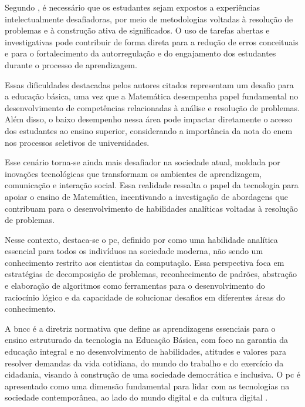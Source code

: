 Segundo , é necessário que os estudantes
sejam expostos a experiências intelectualmente desafiadoras, por meio
de metodologias voltadas à resolução de problemas e à construção ativa 
de significados. O uso de tarefas abertas e
investigativas pode contribuir de forma direta para a redução de erros
conceituais e para o fortalecimento da autorregulação e do engajamento dos
estudantes durante o processo de aprendizagem.

Essas dificuldades destacadas pelos autores citados representam um desafio para a
educação básica, uma vez que a Matemática desempenha papel fundamental no
desenvolvimento de competências relacionadas à análise e resolução
de problemas. Além disso, o baixo desempenho nessa área pode impactar
diretamente o acesso dos estudantes ao ensino superior, considerando a
importância da nota do \gls{enem} nos processos seletivos de universidades. 

Esse cenário torna-se ainda mais desafiador na sociedade atual, moldada por
inovações tecnológicas que transformam os ambientes de aprendizagem, comunicação
e interação social. Essa realidade ressalta o papel da tecnologia para apoiar o
ensino de Matemática, incentivando a investigação de abordagens que contribuam
para o desenvolvimento de habilidades analíticas voltadas à resolução de
problemas.

Nesse contexto, destaca-se o \gls{pc}, definido por
 como uma habilidade analítica essencial para todos os indivíduos
na sociedade moderna, não sendo um conhecimento restrito aos cientistas da
computação. Essa perspectiva foca em estratégias de decomposição de problemas,
reconhecimento de padrões, abstração e elaboração de algoritmos como ferramentas
para o desenvolvimento do raciocínio lógico e da capacidade de solucionar
desafios em diferentes áreas do conhecimento.

A \gls{bncc} é a diretriz normativa que define as aprendizagens essenciais para o
ensino estruturado da tecnologia na Educação Básica, com foco na garantia da
educação integral e no desenvolvimento de habilidades, atitudes e valores para
resolver demandas da vida cotidiana, do mundo do trabalho e do exercício da
cidadania, visando à construção de uma sociedade democrática e inclusiva. O \gls{pc} é
apresentado como uma dimensão fundamental para lidar com as tecnologias na
sociedade contemporânea, ao lado do mundo digital e da cultura digital 
\cite{brasil2017}.

\newpage{}

